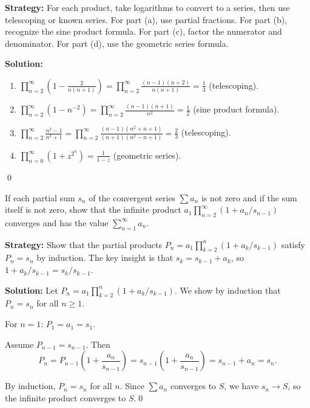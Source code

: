 \noindent\textbf{Strategy:} For each product, take logarithms to convert to a series, then use telescoping or known series. For part (a), use partial fractions. For part (b), recognize the sine product formula. For part (c), factor the numerator and denominator. For part (d), use the geometric series formula.

\bigskip\noindent\textbf{Solution:}
\begin{enumerate}[label=(\alph*)]
\item \(\prod_{n=2}^{\infty} \left( 1 - \frac{2}{n(n+1)} \right) = \prod_{n=2}^{\infty} \frac{(n-1)(n+2)}{n(n+1)} = \frac{1}{3}\) (telescoping).
\item \(\prod_{n=2}^{\infty} (1 - n^{-2}) = \prod_{n=2}^{\infty} \frac{(n-1)(n+1)}{n^2} = \frac{1}{2}\) (sine product formula).
\item \(\prod_{n=2}^{\infty} \frac{n^3 - 1}{n^3 + 1} = \prod_{n=2}^{\infty} \frac{(n-1)(n^2+n+1)}{(n+1)(n^2-n+1)} = \frac{2}{3}\) (telescoping).
\item \(\prod_{n=0}^{\infty} (1 + z^{2^n}) = \frac{1}{1-z}\) (geometric series).
\end{enumerate}\qed



\begin{problembox}
If each partial sum \(s_n\) of the convergent series \(\sum a_n\) is not zero and if the sum itself is not zero, show that the infinite product \(a_1 \prod_{n=2}^{\infty} (1 + a_n / s_{n-1})\) converges and has the value \(\sum_{n=1}^{\infty} a_n\).
\end{problembox}

\noindent\textbf{Strategy:} Show that the partial products \(P_n = a_1 \prod_{k=2}^n (1 + a_k / s_{k-1})\) satisfy \(P_n = s_n\) by induction. The key insight is that \(s_k = s_{k-1} + a_k\), so \(1 + a_k / s_{k-1} = s_k / s_{k-1}\).

\bigskip\noindent\textbf{Solution:}
Let \(P_n = a_1 \prod_{k=2}^n (1 + a_k / s_{k-1})\). We show by induction that \(P_n = s_n\) for all \(n \geq 1\).

For \(n = 1\): \(P_1 = a_1 = s_1\).

Assume \(P_{n-1} = s_{n-1}\). Then
\[P_n = P_{n-1} \left(1 + \frac{a_n}{s_{n-1}}\right) = s_{n-1} \left(1 + \frac{a_n}{s_{n-1}}\right) = s_{n-1} + a_n = s_n.\]

By induction, \(P_n = s_n\) for all \(n\). Since \(\sum a_n\) converges to \(S\), we have \(s_n \to S\), so the infinite product converges to \(S\).\qed



